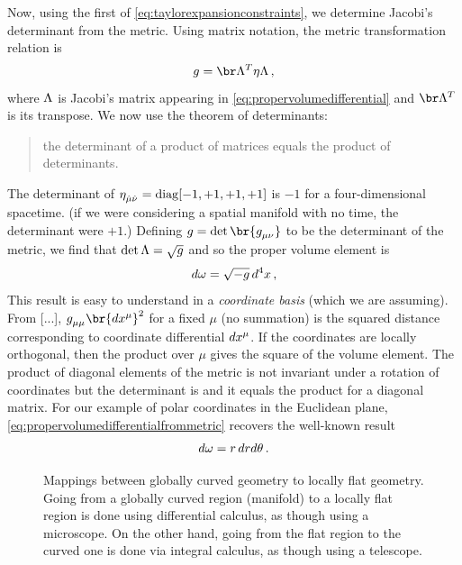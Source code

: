  Now, using the first of \cref{eq:taylorexpansionconstraints}, we determine Jacobi's determinant from the metric. Using matrix notation, the metric transformation relation is
%
\begin{equation*}
  \metric = \trans\transmat\minkmet\transmat\,,
\end{equation*}
%
where $\Lambda$ is Jacobi's matrix appearing in \cref{eq:propervolumedifferential} and $\trans\transmat$ is its transpose. We now use the theorem of determinants:
%
\begin{quotation}
  the determinant of a product of matrices equals the product of determinants.
\end{quotation}
%
The determinant of $\tminkmet{\ridx\mu}{\ridx\nu} = \diag\asmatrix{-1, +1, +1, +1}$ is $-1$ for a four-dimensional spacetime. (if we were considering a spatial manifold with no time, the determinant were $+1$.) Defining $\metric = \det\br{\tmetric\mu\nu}$ to be the determinant of the metric, we find that $\det\Lambda = \sqrt{g}$ and so the proper volume element is
%
\begin{equation}\label{eq:propervolumedifferentialfrommetric}
  d\omega = \sqrt{-g}\,d^{4}x\,,
\end{equation}
%
 This result is easy to understand in a \emph{coordinate basis} (which we are assuming). From [...], $\tmetric\mu\mu\br{d\tvec\pos\mu}^2$ for a fixed $\mu$ (no summation) is the squared distance corresponding to coordinate differential $d\tvec\pos\mu$. If the coordinates are locally orthogonal, then the product over $\mu$ gives the square of the volume element. The product of diagonal elements of the metric is not invariant under a rotation of coordinates but the determinant is and it equals the product for a diagonal matrix. For our example of polar coordinates in the Euclidean plane, \cref{eq:propervolumedifferentialfrommetric} recovers the well-known result
%
\begin{equation*}
  d\omega = r\,dr d\theta\,.
\end{equation*}
%
\begin{figure}[bt]
  \capstart
  \centering
  \caption{Mappings between globally curved geometry to locally flat geometry. Going from a globally curved region (manifold) to a locally flat region is done using differential calculus, as though using a microscope. On the other hand, going from the flat region to the curved one is done via integral calculus, as though using a telescope.}
  \label{fig:globaltolocaltoglobal}
\end{figure}


